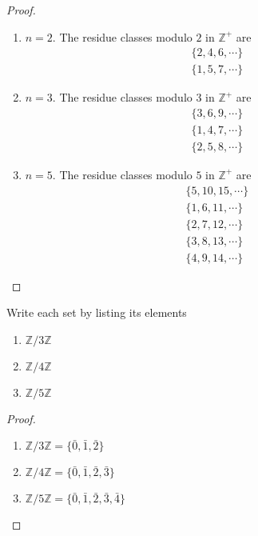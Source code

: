 \begin{proof}
    \begin{enumerate}[label={\textbf{\alph*.}},itemsep=0pt]
        \item $n = 2$. The residue classes modulo $2$ in $\mathbb{Z}^{+}$ are
              \[
                  \begin{split}
                      \{ 2, 4, 6, \cdots \} \\
                      \{ 1, 5, 7, \cdots \}
                  \end{split}
              \]
        \item $n = 3$. The residue classes modulo $3$ in $\mathbb{Z}^{+}$ are
              \[
                  \begin{split}
                      \{ 3, 6, 9, \cdots \} \\
                      \{ 1, 4, 7, \cdots \} \\
                      \{ 2, 5, 8, \cdots \}
                  \end{split}
              \]
        \item $n = 5$. The residue classes modulo $5$ in $\mathbb{Z}^{+}$ are
              \[
                  \begin{split}
                      \{ 5, 10, 15, \cdots \} \\
                      \{ 1, 6, 11, \cdots \} \\
                      \{ 2, 7, 12, \cdots \} \\
                      \{ 3, 8, 13, \cdots \} \\
                      \{ 4, 9, 14, \cdots \}
                  \end{split}
              \]
    \end{enumerate}
\end{proof}

\begin{exercise}
    Write each set by listing its elements
    \begin{enumerate}[label={\textbf{\alph*.}}]
        \item $\mathbb{Z}/3\mathbb{Z}$
        \item $\mathbb{Z}/4\mathbb{Z}$
        \item $\mathbb{Z}/5\mathbb{Z}$
    \end{enumerate}
\end{exercise}

\begin{proof}
    \begin{enumerate}[label={\textbf{\alph*.}}]
        \item $\mathbb{Z}/3\mathbb{Z} = \{ \bar{0}, \bar{1}, \bar{2} \}$
        \item $\mathbb{Z}/4\mathbb{Z} = \{ \bar{0}, \bar{1}, \bar{2}, \bar{3} \}$
        \item $\mathbb{Z}/5\mathbb{Z} = \{ \bar{0}, \bar{1}, \bar{2}, \bar{3}, \bar{4} \}$
    \end{enumerate}
\end{proof}

